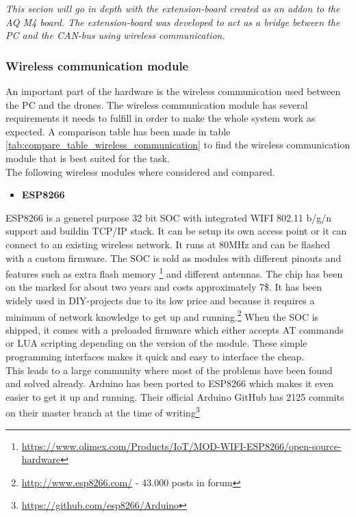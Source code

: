\textit{This secion will go in depth with the extension-board created as an addon to the AQ M4 board. The extension-board was developed to act as a bridge between the PC and the CAN-bus using wireless communication.} \\

\subsubsection*{Wireless communication module} \label{sec:wireless_communication_module}
An important part of the hardware is the wireless communication used between the PC and the drones.
The wireless communication module has several requirements it needs to fulfill in order to make the whole system work as expected. A comparison table has been made in table \ref{tab:compare_table_wireless_communication} to find the wireless communication module that is best suited for the task. \\
The following wireless modules where considered and compared.
\begin{itemize}
	\item \textbf{ESP8266}
\end{itemize}

ESP8266 is a generel purpose 32 bit SOC with integrated WIFI 802.11 b/g/n support and buildin TCP/IP stack. It can be setup its own access point or it can connect to an existing wireless network.
It runs at 80MHz and can be flashed with a custom firmware. 
The SOC is sold as modules with different pinouts and features such as extra flash memory \footnote{\url{https://www.olimex.com/Products/IoT/MOD-WIFI-ESP8266/open-source-hardware}} and different antennas.
The chip has been on the marked for about two years and costs approximately 7\$. 
It has been widely used in DIY-projects due to its low price and because it requires a minimum of network knowledge to get up and running.\footnote{\url{http://www.esp8266.com/} - 43.000 posts in forum} When the SOC is shipped, it comes with a preloaded firmware which either accepts AT commands or LUA scripting depending on the version of the module. These simple programming interfaces makes it quick and easy to interface the cheap. \\
This leads to a large community where most of the problems have been found and solved already. Arduino has been ported to ESP8266 which makes it even easier to get it up and running. Their official Arduino GitHub has 2125 commits on their master branch at the time of writing\footnote{\url{https://github.com/esp8266/Arduino}} \\

